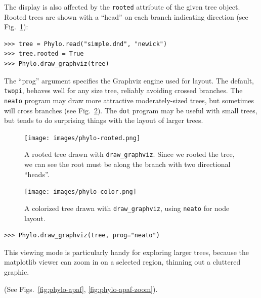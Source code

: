 \documentclass{report}
\begin{document}
The display is also affected by the \verb|rooted| attribute of the given tree object.
Rooted trees are shown with a ``head'' on each branch indicating direction (see
Fig.~\ref{fig:phylo-rooted}):

\begin{verbatim}
>>> tree = Phylo.read("simple.dnd", "newick")
>>> tree.rooted = True
>>> Phylo.draw_graphviz(tree)
\end{verbatim}

\begin{htmlonly}
\label{fig:phylo-rooted}
\end{htmlonly}

The ``prog'' argument specifies the Graphviz engine used for layout. The default,
\verb|twopi|, behaves well for any size tree, reliably avoiding crossed branches. The
\verb|neato| program may draw more attractive moderately-sized trees, but sometimes will
cross branches (see Fig.~\ref{fig:phylo-color}). The \verb|dot| program may be useful
with small trees, but tends to do surprising things with the layout of larger trees.

\begin{latexonly}
\begin{figure}[ptb]
\centering
\texttt{[image: images/phylo-rooted.png]}
\caption{A rooted tree drawn with {\tt draw\_graphviz}.
Since we rooted the tree, we can see the root must be along the branch with two
directional ``heads''.
}
\label{fig:phylo-rooted}
\end{figure}
\begin{figure}[ptb]
\centering
\texttt{[image: images/phylo-color.png]}
\caption{A colorized tree drawn with {\tt draw\_graphviz}, using {\tt neato} for node layout.}
\label{fig:phylo-color}
\end{figure}
\end{latexonly}

\begin{verbatim}
>>> Phylo.draw_graphviz(tree, prog="neato")
\end{verbatim}

\begin{htmlonly}
\label{fig:phylo-color}
\end{htmlonly}

This viewing mode is particularly handy for exploring larger trees, because the matplotlib
viewer can zoom in on a selected region, thinning out a cluttered graphic.
\begin{latexonly}
(See Figs.~\ref{fig:phylo-apaf}, \ref{fig:phylo-apaf-zoom}).
\end{latexonly}
\end{document}
